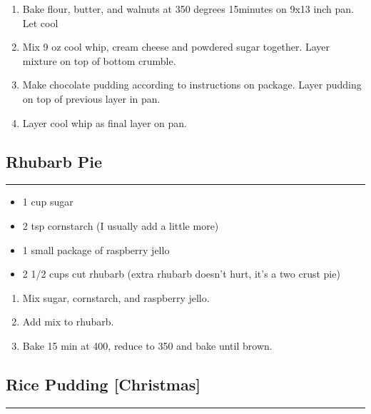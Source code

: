 \documentclass{article}
\begin{document}
\begin{enumerate}
    \item 
        Bake flour, butter, and walnuts at 350 degrees 15minutes on 9x13 inch pan. Let cool
    \item 
        Mix 9 oz cool whip, cream cheese and powdered sugar together. Layer mixture on top of bottom crumble.
    \item 
        Make chocolate pudding according to instructions on package. Layer pudding on top of previous layer in pan.
    \item 
        Layer cool whip as final layer on pan. 
\end{enumerate}
\newpage

\subsection{Rhubarb Pie} 
\noindent\rule[0.5ex]{\linewidth}{1pt}

\begin{framed}
    \begin{itemize}
        \item 1 cup sugar
        \item 2 tsp cornstarch (I usually add a little more)
        \item 1 small package of raspberry jello
        \item 2 1/2 cups cut rhubarb (extra rhubarb doesn't hurt, it's a two crust pie)
    \end{itemize}
\end{framed}

\begin{enumerate}
    \item 
        Mix sugar, cornstarch, and raspberry jello.
    \item 
        Add mix to rhubarb. 
    \item
        Bake 15 min at 400, reduce to 350 and bake until brown.
\end{enumerate}
\newpage

\subsection{Rice Pudding [Christmas]} 
\noindent\rule[0.5ex]{\linewidth}{1pt}
\end{document}
